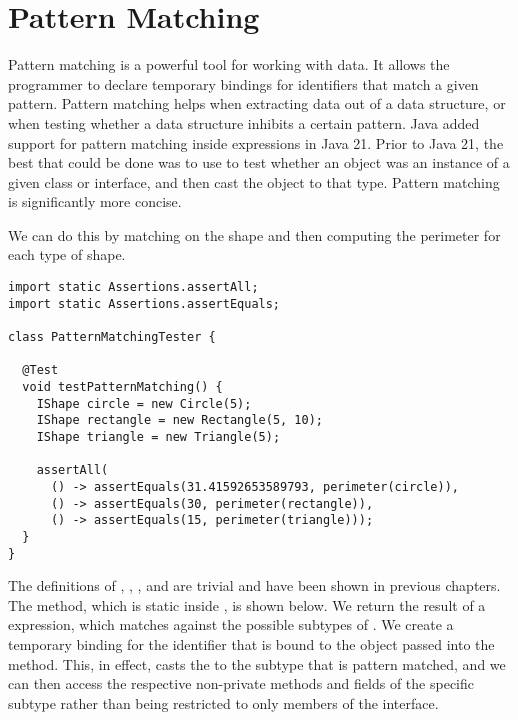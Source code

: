 \section{Pattern Matching}

Pattern matching is a powerful tool for working with data. 
It allows the programmer to declare temporary bindings for identifiers that match a given pattern. 
Pattern matching helps when extracting data out of a data structure, or when testing whether a data structure inhibits a certain pattern. 
Java added support for pattern matching inside  expressions in Java 21.
Prior to Java 21, the best that could be done was to use  to test whether an object was an instance of a given class or interface, and then cast the object to that type. 
Pattern matching is significantly more concise.

We can do this by matching on the shape and then computing the perimeter for each type of shape.

\begin{lstlisting}[language=MyJava]
import static Assertions.assertAll;
import static Assertions.assertEquals;

class PatternMatchingTester {

  @Test
  void testPatternMatching() {
    IShape circle = new Circle(5);
    IShape rectangle = new Rectangle(5, 10);
    IShape triangle = new Triangle(5);

    assertAll(
      () -> assertEquals(31.41592653589793, perimeter(circle)),
      () -> assertEquals(30, perimeter(rectangle)),
      () -> assertEquals(15, perimeter(triangle)));
  }
}
\end{lstlisting}

The definitions of , , , and  are trivial and have been shown in previous chapters. 
The  method, which is static inside , is shown below.
We return the result of a  expression, which matches against the possible subtypes of . 
We create a temporary binding for the identifier  that is bound to the  object passed into the method. 
This, in effect, casts the  to the subtype that is pattern matched, and we can then access the respective non-private methods and fields of the specific subtype rather than being restricted to only members of the  interface.


